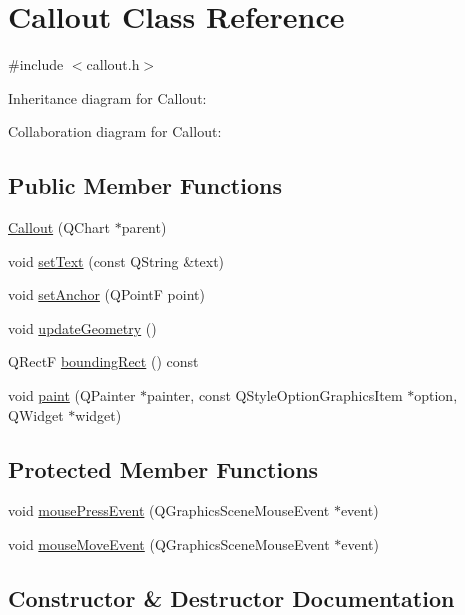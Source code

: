 \hypertarget{class_callout}{}\section{Callout Class Reference}
\label{class_callout}


{\ttfamily \#include $<$callout.\+h$>$}



Inheritance diagram for Callout\+:


Collaboration diagram for Callout\+:
\subsection*{Public Member Functions}
\begin{DoxyCompactItemize}
\item 
\hyperlink{class_callout_a5c15b9a45dd03b935e8ae61105272bca}{Callout} (Q\+Chart $\ast$parent)
\item 
void \hyperlink{class_callout_a5d3f7cfd1413b86ced5df4531cb61c08}{set\+Text} (const Q\+String \&text)
\item 
void \hyperlink{class_callout_a6784cb674bf4bf81f40fd42d15ac869e}{set\+Anchor} (Q\+PointF point)
\item 
void \hyperlink{class_callout_a38c97e1c4e69816abd3328d71ecf2e66}{update\+Geometry} ()
\item 
Q\+RectF \hyperlink{class_callout_a4ec6f6df3848b957f3c45177830fedcb}{bounding\+Rect} () const
\item 
void \hyperlink{class_callout_a291ff0c394d7b11dc7befcf24214b335}{paint} (Q\+Painter $\ast$painter, const Q\+Style\+Option\+Graphics\+Item $\ast$option, Q\+Widget $\ast$widget)
\end{DoxyCompactItemize}
\subsection*{Protected Member Functions}
\begin{DoxyCompactItemize}
\item 
void \hyperlink{class_callout_af5565beb8739b7bdf5f525004a8b9ab7}{mouse\+Press\+Event} (Q\+Graphics\+Scene\+Mouse\+Event $\ast$event)
\item 
void \hyperlink{class_callout_a37dfa3540fd589d0ae39949c8264ff39}{mouse\+Move\+Event} (Q\+Graphics\+Scene\+Mouse\+Event $\ast$event)
\end{DoxyCompactItemize}


\subsection{Constructor \& Destructor Documentation}
\mbox{\label{class_callout_a5c15b9a45dd03b935e8ae61105272bca}} 
